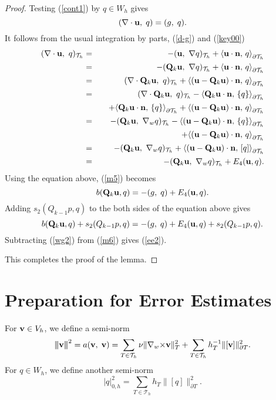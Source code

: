 \documentclass[11pt]{amsart}
\newcommand{\bu}{{\bf u}}
\newcommand{\bv}{{\bf v}}
\newcommand{\bQ}{{\bf Q}}
\newcommand{\cw}{{\nabla_w\times}}
\def\T{{\mathcal T}}
\def\pT{{\partial T}}
\def\l{{\langle}}
\def\r{{\rangle}}
\def\bn{{\bf n}}
\def\3bar{{|\hspace{-.02in}|\hspace{-.02in}|}}
\begin{document}
\begin{proof}
Testing (\ref{cont1}) by $q\in W_h$ gives
\begin{equation}\label{m5}
(\nabla\cdot\bu,\;q)=(g,\; q).
\end{equation}
It follows from the usual integration by parts, (\ref{d-g}) and (\ref{key00})
\begin{eqnarray*}
(\nabla\cdot\bu,\ q)_{\T_h}&=&-(\bu,\ \nabla q)_{\T_h}+\l \bu\cdot\bn,\,q\r_{\partial\T_h}\\
&=&-(\bQ_k \bu,\ \nabla q)_{\T_h}+\l \bu\cdot\bn,\,q\r_{\partial\T_h}\\
&=&(\nabla\cdot\bQ_k\bu,\  q)_{\T_h}+\l (\bu-\bQ_k\bu)\cdot\bn,\,q\r_{\partial\T_h}\\
&=&(\nabla\cdot\bQ_k\bu,\  q)_{\T_h}-\l \bQ_k\bu\cdot\bn,\,\{q\}\r_{\partial\T_h}\\
  && \quad 
 +\l \bQ_k\bu\cdot\bn,\,\{q\}\r_{\partial\T_h}+\l (\bu-\bQ_k\bu)\cdot\bn,\,q\r_{\partial\T_h}\\
&=&-(\bQ_k\bu,\  \nabla_w q)_{\T_h}-\l (\bu-\bQ_k\bu)\cdot\bn,\,\{q\}\r_{\partial\T_h}
  \\ &&\quad +\l (\bu-\bQ_k\bu)\cdot\bn,\,q\r_{\partial\T_h}\\
&=&-(\bQ_k\bu,\  \nabla_w q)_{\T_h}+\l (\bu-\bQ_k\bu)\cdot\bn,\,[q]\r_{\partial\T_h}\\
&=&-(\bQ_k\bu,\  \nabla_w q)_{\T_h}+E_4(\bu,q).
\end{eqnarray*}
Using the equation above, (\ref{m5}) becomes
\[
b(\bQ_k\bu,q)=-(g,\; q)+E_4(\bu,q).
\]
Adding  $s_2(Q_{k-1}p,q)$  to the both sides of the equation above gives
\begin{equation}\label{m6}
b(\bQ_k\bu,q)+s_2(Q_{k-1}p,q)=-(g,\; q)+E_4(\bu,q)+s_2(Q_{k-1}p,q).
\end{equation}
Subtracting  (\ref{wg2}) from (\ref{m6}) gives (\ref{ee2}).

This completes the proof of the lemma.
\end{proof}

\section{Preparation for Error Estimates}\label{Section:L2Projections}

For $\bv\in V_{h}$, we define a semi-norm
\begin{equation}\label{3barnorm}
\3bar \bv\3bar^2=a(\bv,\;\bv)=\sum_{T\in\T_h}\nu\|\cw\bv\|_T^2
   +\sum_{T\in\T_h}h_T^{-1}\|[\bv]\|_\pT^2.
\end{equation}
For $q\in W_h$,  we define another semi-norm  
\begin{equation}\label{qnorm}
|q|_{0,h}^2=\sum_{T\in\T_h}h_T\|[q]\|_\pT^2.
\end{equation}
\end{document}
